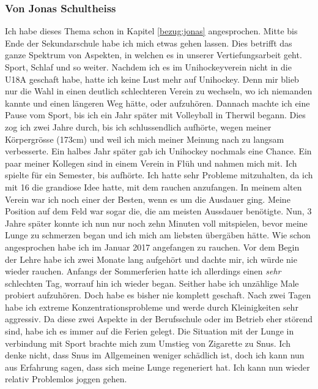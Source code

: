 \subsubsection{Von Jonas Schultheiss}
Ich habe dieses Thema schon in Kapitel \ref{bezug:jonas} angesprochen.
\newline
Mitte bis Ende der Sekundarschule habe ich mich etwas gehen lassen. Dies betrifft das ganze Spektrum von Aspekten, in welchen es in unserer Vertiefungsarbeit geht. Sport, Schlaf und so weiter. Nachdem ich es im Unihockeyverein nicht in die U18A geschaft habe, hatte ich keine Lust mehr auf Unihockey. Denn mir blieb nur die Wahl in einen deutlich schlechteren Verein zu wechseln, wo ich niemanden kannte und einen längeren Weg hätte, oder aufzuhören. Dannach machte ich eine Pause vom Sport, bis ich ein Jahr später mit Volleyball in Therwil begann. Dies zog ich zwei Jahre durch, bis ich schlussendlich aufhörte, wegen meiner Körpergrösse (173cm) und weil ich mich meiner Meinung nach zu langsam verbesserte. Ein halbes Jahr später gab ich Unihockey nochmals eine Chance. Ein paar meiner Kollegen sind in einem Verein in Flüh und nahmen mich mit. Ich spielte für ein Semester, bis aufhörte. Ich hatte sehr Probleme mitzuhalten, da ich mit 16 die grandiose Idee hatte, mit dem rauchen anzufangen. In meinem alten Verein war ich noch einer der Besten, wenn es um die Ausdauer ging. Meine Position auf dem Feld war sogar die, die am meisten Aussdauer benötigte. Nun, 3 Jahre später konnte ich nun nur noch zehn Minuten voll mitspielen, bevor meine Lunge zu schmerzen began und ich mich am liebsten übergäben hätte.
\newline
Wie schon angesprochen habe ich im Januar 2017 angefangen zu rauchen. Vor dem Begin der Lehre habe ich zwei Monate lang aufgehört und dachte mir, ich würde nie wieder rauchen. Anfangs der Sommerferien hatte ich allerdings einen \textit{sehr} schlechten Tag, worrauf hin ich wieder began. Seither habe ich unzählige Male probiert aufzuhören. Doch habe es bisher nie komplett geschaft. Nach zwei Tagen habe ich extreme Konzentrationsprobleme und werde durch Kleinigkeiten sehr aggressiv. Da diese zwei Aspekte in der Berufsschule oder im Betrieb eher störend sind, habe ich es immer auf die Ferien gelegt. Die Situation mit der Lunge in verbindung mit Sport brachte mich zum Umstieg von Zigarette zu Snus. Ich denke nicht, dass Snus im Allgemeinen weniger schädlich ist, doch ich kann nun aus Erfahrung sagen, dass sich meine Lunge regeneriert hat. Ich kann nun wieder relativ Problemlos joggen gehen.
\newline
